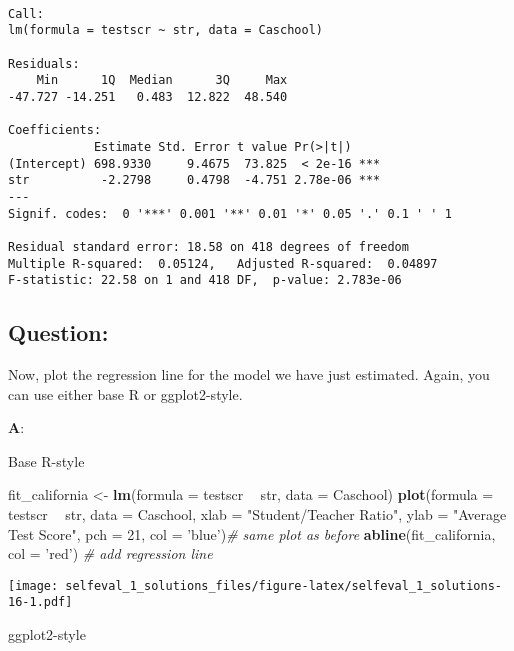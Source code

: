 \documentclass[12pt,]{article}
\newenvironment{Shaded}{\begin{snugshade}}{\end{snugshade}}
\newcommand{\CommentTok}[1]{\textcolor[rgb]{0.56,0.35,0.01}{\textit{#1}}}
\newcommand{\DataTypeTok}[1]{\textcolor[rgb]{0.13,0.29,0.53}{#1}}
\newcommand{\DecValTok}[1]{\textcolor[rgb]{0.00,0.00,0.81}{#1}}
\newcommand{\KeywordTok}[1]{\textcolor[rgb]{0.13,0.29,0.53}{\textbf{#1}}}
\newcommand{\NormalTok}[1]{#1}
\newcommand{\OperatorTok}[1]{\textcolor[rgb]{0.81,0.36,0.00}{\textbf{#1}}}
\newcommand{\StringTok}[1]{\textcolor[rgb]{0.31,0.60,0.02}{#1}}
\begin{document}
\begin{verbatim}

Call:
lm(formula = testscr ~ str, data = Caschool)

Residuals:
    Min      1Q  Median      3Q     Max 
-47.727 -14.251   0.483  12.822  48.540 

Coefficients:
            Estimate Std. Error t value Pr(>|t|)    
(Intercept) 698.9330     9.4675  73.825  < 2e-16 ***
str          -2.2798     0.4798  -4.751 2.78e-06 ***
---
Signif. codes:  0 '***' 0.001 '**' 0.01 '*' 0.05 '.' 0.1 ' ' 1

Residual standard error: 18.58 on 418 degrees of freedom
Multiple R-squared:  0.05124,   Adjusted R-squared:  0.04897 
F-statistic: 22.58 on 1 and 418 DF,  p-value: 2.783e-06
\end{verbatim}

\hypertarget{question-10}{%
\subsection{Question:}\label{question-10}}

Now, plot the regression line for the model we have just estimated.
Again, you can use either base R or ggplot2-style.

\textbf{A}:

Base R-style

\begin{Shaded}
\begin{Highlighting}[]
\NormalTok{fit_california <-}\StringTok{ }\KeywordTok{lm}\NormalTok{(}\DataTypeTok{formula =}\NormalTok{ testscr }\OperatorTok{~}\StringTok{ }\NormalTok{str, }\DataTypeTok{data =}\NormalTok{ Caschool)}
\KeywordTok{plot}\NormalTok{(}\DataTypeTok{formula =}\NormalTok{ testscr }\OperatorTok{~}\StringTok{ }\NormalTok{str,}
     \DataTypeTok{data =}\NormalTok{ Caschool,}
     \DataTypeTok{xlab =} \StringTok{"Student/Teacher Ratio"}\NormalTok{,}
     \DataTypeTok{ylab =} \StringTok{"Average Test Score"}\NormalTok{, }\DataTypeTok{pch =} \DecValTok{21}\NormalTok{, }\DataTypeTok{col =} \StringTok{'blue'}\NormalTok{)}\CommentTok{# same plot as before}
\KeywordTok{abline}\NormalTok{(fit_california, }\DataTypeTok{col =} \StringTok{'red'}\NormalTok{) }\CommentTok{# add regression line}
\end{Highlighting}
\end{Shaded}

\texttt{[image: selfeval\_1\_solutions\_files/figure-latex/selfeval\_1\_solutions-16-1.pdf]}

ggplot2-style
\end{document}
